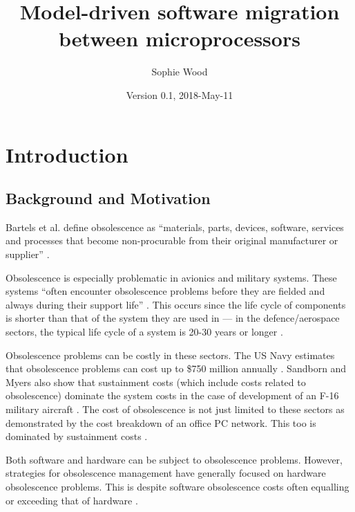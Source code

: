 \documentclass{UoYCSproject}
\author{Sophie Wood}
\title{Model-driven software migration between microprocessors}
\date{Version 0.1, 2018-May-11}
\begin{document}
\maketitle

\chapter{Introduction}
\section{Background and Motivation}

Bartels et al. define obsolescence as ``materials, parts, devices, software, services and processes that become non-procurable from their original manufacturer or supplier'' \parencite{bartels2012strategies}. 

Obsolescence is especially problematic in avionics and military systems. These systems ``often encounter obsolescence problems before they are fielded and always during their support life'' \parencite{singh2006obsolescence}. This occurs since the life cycle of components is shorter than that of the system they are used in --- in the defence/aerospace sectors, the typical life cycle of a system is 20-30 years or longer \parencite{rojo2010obsolescence}.

Obsolescence problems can be costly in these sectors. The US Navy estimates that obsolescence problems can cost up to \$750 million annually \parencite{adams2005getting}. Sandborn and Myers also show that sustainment costs (which include costs related to obsolescence) dominate the system costs in the case of development of an F-16 military aircraft \parencite{sandborn2008designing}. The cost of obsolescence is not just limited to these sectors as demonstrated by the cost breakdown of an office PC network. This too is dominated by sustainment costs \parencite{sandborn2008designing}. 

Both software and hardware can be subject to obsolescence problems. However, strategies for obsolescence management have generally focused on hardware obsolescence problems. This is despite software obsolescence costs often equalling or exceeding that of hardware \parencite{sandborn2007obsolescence}. 
\end{document}
